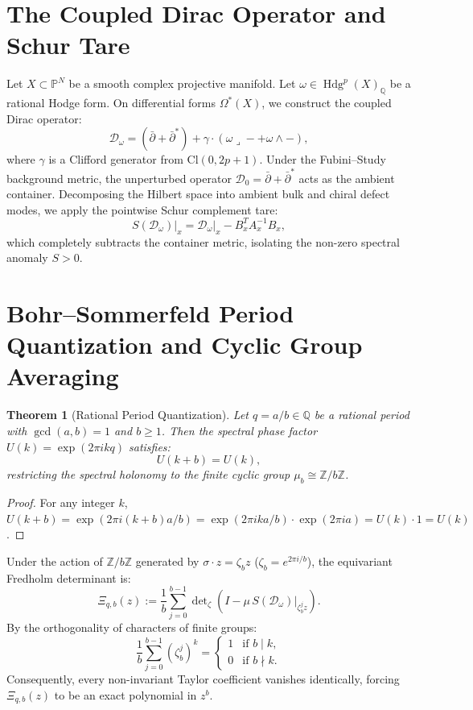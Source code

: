 \documentclass[11pt,a4paper]{article}
\newtheorem{theorem}{Theorem}[section]
\theoremstyle{definition}
\begin{document}
\section{The Coupled Dirac Operator and Schur Tare}

Let $X \subset \mathbb{P}^N$ be a smooth complex projective manifold. Let $\omega \in \operatorname{Hdg}^p(X)_{\mathbb{Q}}$ be a rational Hodge form. On differential forms $\Omega^*(X)$, we construct the coupled Dirac operator:
\[
  \mathcal{D}_\omega = (\bar{\partial} + \bar{\partial}^*) + \gamma \cdot (\omega \lrcorner - + \omega \wedge -),
\]
where $\gamma$ is a Clifford generator from $\mathrm{Cl}(0, 2p+1)$.
Under the Fubini--Study background metric, the unperturbed operator $\mathcal{D}_0 = \bar{\partial} + \bar{\partial}^*$ acts as the ambient container.
Decomposing the Hilbert space into ambient bulk and chiral defect modes, we apply the pointwise Schur complement tare:
\[
  S(\mathcal{D}_\omega)\big|_x = \mathcal{D}_\omega\big|_x - B_x^T A_x^{-1} B_x,
\]
which completely subtracts the container metric, isolating the non-zero spectral anomaly $S > 0$.

\section{Bohr--Sommerfeld Period Quantization and Cyclic Group Averaging}

\begin{theorem}[Rational Period Quantization]
Let $q = a/b \in \mathbb{Q}$ be a rational period with $\gcd(a, b) = 1$ and $b \ge 1$. Then the spectral phase factor $U(k) = \exp(2\pi i k q)$ satisfies:
\[
  U(k + b) = U(k),
\]
restricting the spectral holonomy to the finite cyclic group $\mu_b \cong \mathbb{Z}/b\mathbb{Z}$.
\end{theorem}
\begin{proof}
For any integer $k$, $U(k + b) = \exp(2\pi i (k + b) a / b) = \exp(2\pi i k a / b) \cdot \exp(2\pi i a) = U(k) \cdot 1 = U(k)$.
\end{proof}

Under the action of $\mathbb{Z}/b\mathbb{Z}$ generated by $\sigma \cdot z = \zeta_b z$ ($\zeta_b = e^{2\pi i / b}$), the equivariant Fredholm determinant is:
\[
  \Xi_{q, b}(z) := \frac{1}{b} \sum_{j=0}^{b-1} \det\nolimits_{\zeta}\!\left( I - \mu\,S(\mathcal{D}_\omega)\big|_{\zeta_b^j z} \right).
\]
By the orthogonality of characters of finite groups:
\[
  \frac{1}{b} \sum_{j=0}^{b-1} (\zeta_b^j)^k = \begin{cases} 1 & \text{if } b \mid k, \\ 0 & \text{if } b \nmid k. \end{cases}
\]
Consequently, every non-invariant Taylor coefficient vanishes identically, forcing $\Xi_{q, b}(z)$ to be an exact polynomial in $z^b$.
\end{document}
